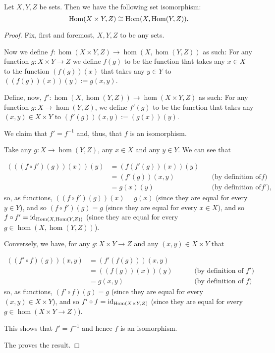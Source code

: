 \begin{theorem}
	Let $X,Y,Z$ be sets. Then we have the following set isomorphism:
	\[\mathrm{Hom}(X\times Y,Z)\cong\mathrm{Hom}(X,\mathrm{Hom}(Y,Z)).\]
\end{theorem}
\begin{proof}
	Fix, first and foremost, $X,Y,Z$ to be any sets.
	
	Now we define $f:\hom(X\times Y,Z)\to\hom(X,\hom(Y,Z))$ as such: For any function $g:X\times Y\to Z$ we define $f(g)$ to be the function that takes any $x\in X$ to the function $(f(g))(x)$ that takes any $y\in Y$ to $((f(g))(x))(y):=g(x,y)$.
	
	Define, now, $f':\hom(X,\hom(Y,Z))\to\hom(X\times Y,Z)$ as such: For any function $g:X\to \hom(Y,Z)$, we define $f'(g)$ to be the function that takes any $(x,y)\in X\times Y$ to $(f'(g))(x,y):=(g(x))(y)$.
	
	We claim that $f'=f^{-1}$ and, thus, that $f$ is an isomorphism.
	
	Take any $g:X\to \hom(Y,Z)$, any $x\in X$ and any $y\in Y$. We can see that
	
	\[\begin{array}{rlr}
		(((f\circ f')(g))(x))(y)&=(f(f'(g))(x))(y)\\
		&=(f'(g))(x,y)\quad&\quad\mbox{(by definition of }f)\\
		&=g(x)(y)\quad&\quad\mbox{(by definition of }f'),
	\end{array}\]so, as functions, $((f\circ f')(g))(x)=g(x)$ (since they are equal for every $y\in Y$), and so $(f\circ f')(g)=g$ (since they are equal for every $x\in X$), and so $f\circ f'={\rm id}_{\mathrm{Hom}(X,\mathrm{Hom}(Y,Z))}$ (since they are equal for every $g\in\hom(X,\hom(Y,Z))$).
	
	\bigskip
	Conversely, we have, for any $g:X\times Y\to Z$ and any $(x,y)\in X\times Y$ that
	
	\[\begin{array}{rlr}
	((f'\circ f)(g))(x,y)&=(f'(f(g)))(x,y)\\
	&=((f(g))(x))(y)\quad&\quad\mbox{ (by definition of }f')\\
	&=g(x,y)\quad&\quad\mbox{ (by definition of }f)
	\end{array}\]so, as functions, $(f'\circ f)(g)=g$ (since they are equal for every $(x,y)\in X\times Y$), and so $f'\circ f={\rm id}_{\mathrm{Hom}(X\times Y, Z)}$ (since they are equal for every $g\in\hom(X\times Y\to Z)$).
	
	\bigskip
	This shows that $f'=f^{-1}$ and hence $f$ is an isomorphism.
	
	The proves the result.
\end{proof}

